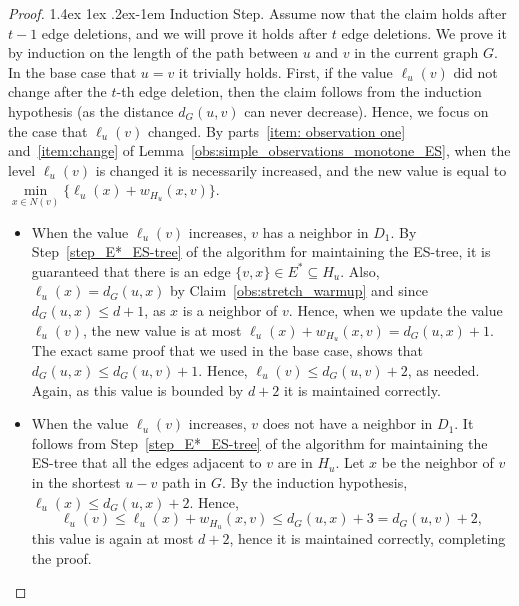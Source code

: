 \documentclass[11pt]{article}
\makeatletter
\theoremstyle{definition}
\theoremstyle{remark}
\renewcommand{\paragraph}{%
  \@startsection{paragraph}{4}%
  {\z@}{1.4ex \@plus 1ex \@minus .2ex}{-1em}%
  {\normalfont\normalsize\bfseries}%
}
\makeatother
\begin{document}
\begin{titlepage}
\begin{proof}
\paragraph{Induction Step.} Assume now that the claim holds after $t-1$ edge deletions, and we will prove it holds after $t$ edge deletions. We prove it by induction on the length of the path between $u$ and $v$ in the current graph $G$. In the base case that $u=v$ it trivially holds.
First, if the value $\ell_u(v)$ did not change after the $t$-th edge deletion, then the claim follows from the induction hypothesis (as the distance $d_G(u,v)$ can never decrease). Hence, we focus on the case that $\ell_u(v)$ changed. By parts~\ref{item: observation one} and~\ref{item:change} of Lemma~\ref{obs:simple_observations_monotone_ES}, when the level $\ell_u(v)$ is changed it is necessarily increased, and the new value is equal to $\min\limits_{x\in N(v)} \{\ell_u(x)+w_{H_u}(x,v) \}$. 

\begin{itemize}
    \item [Case 1:] When the value $\ell_u(v)$ increases, $v$ has a neighbor in $D_1$. By Step~\ref{step_E*_ES-tree} of the algorithm for maintaining the ES-tree, it is guaranteed that there is an edge $\{v,x\} \in E^* \subseteq H_u$. Also, $\ell_u(x)=d_G(u,x)$ by Claim~\ref{obs:stretch_warmup} and since $d_G(u,x) \leq d+1$, as $x$ is a neighbor of $v$. Hence, when we update the value $\ell_u(v)$, the new value is at most $\ell_u(x)+w_{H_u}(x,v)=d_G(u,x)+1.$ The exact same proof that we used in the base case, shows that $d_G(u,x) \leq d_G(u,v)+1$. Hence, $\ell_u(v) \leq d_G(u,v) +2$, as needed. Again, as this value is bounded by $d+2$ it is maintained correctly.
    \item [Case 2:] When the value $\ell_u(v)$ increases, $v$ does not have a neighbor in $D_1$. It follows from Step~\ref{step_E*_ES-tree} of the algorithm for maintaining the ES-tree that all the edges adjacent to $v$ are in $H_u$. Let $x$ be the neighbor of $v$ in the shortest $u-v$ path in $G$. By the induction hypothesis, $\ell_u(x) \leq d_G(u,x)+2$. Hence, $$\ell_u(v) \leq \ell_u(x)+w_{H_u}(x,v) \leq d_G(u,x)+3 = d_G(u,v)+2,$$ this value is again at most $d+2$, hence it is maintained correctly, completing the proof.\qedhere
\end{itemize}
\end{proof}



\end{titlepage}
\end{document}
